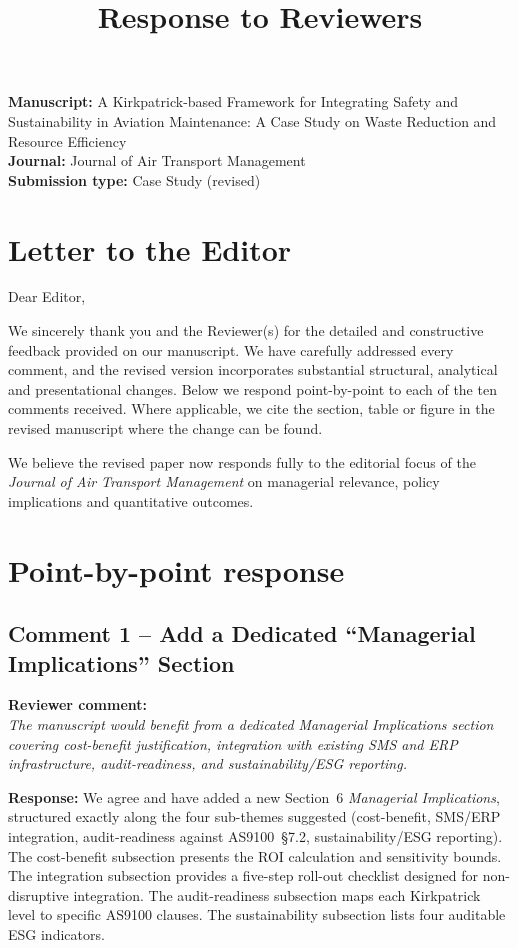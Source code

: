 \documentclass[11pt,a4paper]{article}
\title{Response to Reviewers}
\author{\vspace{-1em}}
\date{}
\newcommand{\comment}[1]{\par\smallskip\noindent\textbf{\color{blue!60!black}Reviewer comment:}\\ \emph{#1}\par\smallskip}
\newcommand{\response}[1]{\noindent\textbf{Response:} #1\par\smallskip}
\begin{document}
\maketitle

\noindent\textbf{Manuscript:} A Kirkpatrick-based Framework for Integrating
Safety and Sustainability in Aviation Maintenance: A Case Study on Waste
Reduction and Resource Efficiency \\
\noindent\textbf{Journal:} Journal of Air Transport Management \\
\noindent\textbf{Submission type:} Case Study (revised)

\section*{Letter to the Editor}

Dear Editor,

We sincerely thank you and the Reviewer(s) for the detailed and constructive
feedback provided on our manuscript. We have carefully addressed every
comment, and the revised version incorporates substantial structural,
analytical and presentational changes. Below we respond point-by-point to
each of the ten comments received. Where applicable, we cite the section,
table or figure in the revised manuscript where the change can be found.

We believe the revised paper now responds fully to the editorial focus of
the \emph{Journal of Air Transport Management} on managerial relevance,
policy implications and quantitative outcomes.

\section*{Point-by-point response}

\subsection*{Comment 1 -- Add a Dedicated ``Managerial Implications'' Section}
\comment{The manuscript would benefit from a dedicated Managerial Implications
section covering cost-benefit justification, integration with existing SMS
and ERP infrastructure, audit-readiness, and sustainability/ESG reporting.}

\response{We agree and have added a new Section~6 \emph{Managerial
Implications}, structured exactly along the four sub-themes suggested
(cost-benefit, SMS/ERP integration, audit-readiness against AS9100~§7.2,
sustainability/ESG reporting). The cost-benefit subsection presents the
ROI calculation and sensitivity bounds. The integration subsection provides
a five-step roll-out checklist designed for non-disruptive integration. The
audit-readiness subsection maps each Kirkpatrick level to specific AS9100
clauses. The sustainability subsection lists four auditable ESG indicators.}
\end{document}
